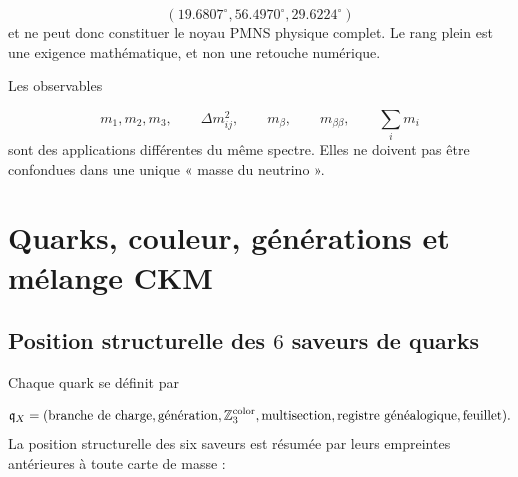 \[
 (19.6807^\circ,56.4970^\circ,29.6224^\circ)
\]
et ne peut donc constituer le noyau PMNS physique complet. Le rang plein est une exigence mathématique, et non une retouche numérique.

Les observables

\[
 m_1,m_2,m_3,\qquad
 \Delta m_{ij}^2,\qquad
 m_\beta,\qquad
 m_{\beta\beta},\qquad
 \sum_i m_i
\]
sont des applications différentes du même spectre. Elles ne doivent pas être confondues dans une unique « masse du neutrino ».

\section{Quarks, couleur, générations et mélange CKM}
\subsection{Position structurelle des \(6\) saveurs de quarks}
Chaque quark se définit par

\[
 \mathfrak q_X=
 (\text{branche de charge},\text{génération},
 \mathbb Z_3^{\rm color},\text{multisection},
 \text{registre généalogique},\text{feuillet}).
\]
La position structurelle des six saveurs est résumée par leurs empreintes antérieures à toute carte de masse :

